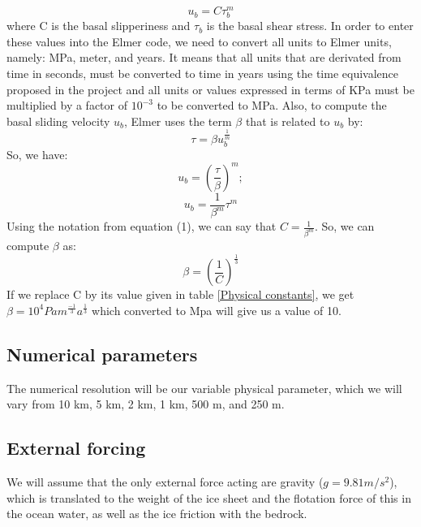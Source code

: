 \documentclass{article}
\begin{document}
\begin{equation}
	u_b = C\tau _b^m
\end{equation}
where C is the basal slipperiness and $\tau _b$ is the basal shear stress.
In order to enter these values into the Elmer code, we need to convert all units to Elmer units, namely: MPa, meter, and years. It means that all units that are derivated from time in seconds, must be converted to time in years using the time equivalence proposed in the project and all units or values expressed in terms of KPa must be multiplied by a factor of $10^{-3}$ to be converted to MPa.
Also, to compute the basal sliding velocity $u_b$, Elmer uses the term $\beta$ that is related to $u_b$ by:
\begin{equation}
	\tau = \beta u_b^{\frac{1}{m}}
\end{equation}
So, we have:
\begin{equation}
	u_b = (\frac{\tau}{\beta})^m;
\end{equation}
\begin{equation}
	u_b = \frac{1}{\beta^m} \tau^m
\end{equation}
Using the notation from equation (1), we can say that $C=  \frac{1}{\beta^m}$. So, we can compute $\beta$ as:
\begin{equation}
	\beta=(\frac{1}{C})^{\frac{1}{3}}
\end{equation}
If we replace C by its value given in table \ref{Physical constants}, we get $\beta= 10^4 Pa m^{\frac{-1}{3}} a^{\frac{1}{3}}$ which converted to Mpa will give us a value of 10.

\subsection{Numerical parameters}
The numerical resolution will be our variable physical parameter, which we will vary from 10 km, 5 km, 2 km, 1 km, 500 m, and 250 m. 
\subsection{External forcing}
We will assume that the only external force acting are gravity ($g=9.81 m/s^2$), which is translated to the weight of the ice sheet and the flotation force of this in the ocean water, as well as the ice friction with the bedrock.
\end{document}
